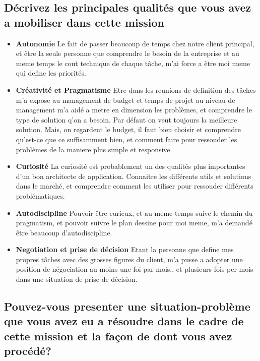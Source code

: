 \documentclass{resume} %
\begin{document}
	\subsection{Décrivez les principales qualités que vous avez a mobiliser dans cette mission}
	
		\begin{itemize} 				
			\item \textbf{Autonomie} \newline
				Le fait de passer beaucoup de temps chez notre client principal, et être la seule personne que comprendre le besoin de la entreprise et au meme temps le cout technique de chaque tâche, m'ai force a être moi meme qui define les priorités. 
			\item \textbf{Créativité et Pragmatisme } \newline
				Etre dans les reunions de definition des tâches m'a expose au management de budget et temps de projet au niveau de management m'a aidé a metre en dimension les problèmes, et comprendre le type de solution q'on a besoin. Par défaut on veut toujours la meilleure solution. Mais, on regardent le budget, il faut bien choisir et comprendre qu'est-ce que ce suffisamment bien, et comment faire pour ressouder les problèmes de la maniere plus simple et responsive. 
			\item \textbf{Curiosité } \newline
				La curiosité est probablement un des qualités plus importantes d'un bon architecte de application. Connaitre les différents utils et solutions dans le marché, et comprendre comment les utiliser pour ressouder différents problématiques.
			\item \textbf{Autodiscipline} \newline
				Pouvoir être curieux, et au meme temps suive le chemin du pragmatism, et pouvoir suivre le plan dessine pour moi meme, m'a demandé être  beaucoup d'autodiscipline.
			\item \textbf{Negotiation  et prise de décision } \newline
				Etant la personne que define mes propres tâches avec des grosses figures du client, m'a pusse a adopter une position de négociation au moins une foi par mois., et plusieurs fois per mois dans une situation de prise de décision.  
		\end{itemize}
		
	\subsection{Pouvez-vous presenter une situation-problème que vous avez eu a résoudre dans le cadre de cette mission et la façon de dont vous avez procédé?}
	
\end{document}
